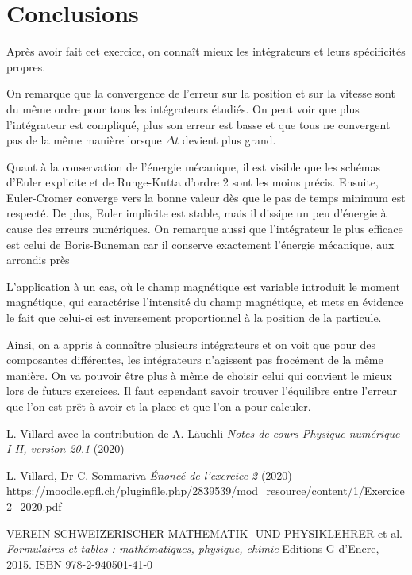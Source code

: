 \documentclass[a4paper,12pt,twoside]{article}
\begin{document}
\section{Conclusions}

Apr\`es avoir fait cet exercice, on conna\^it mieux les int\'egrateurs et leurs sp\'ecificit\'es propres. 

On remarque que la convergence de l'erreur sur la position et sur la vitesse sont du m\^eme ordre pour tous les int\'egrateurs \'etudi\'es. 
On peut voir que plus l'int\'egrateur est compliqu\'e, plus son erreur est basse et que tous ne convergent pas de la m\^eme mani\`ere lorsque $\Delta t$ devient plus grand. 

Quant \`a la conservation de l'\'energie m\'ecanique, il est visible que les sch\'emas d'Euler explicite et de Runge-Kutta d'ordre 2 sont les moins pr\'ecis.  Ensuite, Euler-Cromer converge vers la bonne valeur d\`es que le pas de temps minimum est respect\'e. De plus, Euler implicite est stable, mais il dissipe un peu d'\'energie \`a cause des erreurs num\'eriques. 
On remarque aussi que l'int\'egrateur le plus efficace est celui de Boris-Buneman car il conserve exactement l'\'energie m\'ecanique, aux arrondis pr\`es

L'application \`a un cas, o\`u le champ magn\'etique est variable introduit le moment magn\'etique, qui caract\'erise l'intensit\'e du champ magn\'etique, et mets en \'evidence le fait que celui-ci est inversement proportionnel \`a la position de la particule.


Ainsi, on a appris \`a conna\^itre plusieurs int\'egrateurs et on voit que pour des composantes diff\'erentes, les int\'egrateurs n'agissent pas froc\'ement de la m\^eme mani\`ere. On va pouvoir \^etre plus \`a m\^eme de choisir celui qui convient le mieux lors de futurs exercices. Il faut cependant savoir trouver l'\'equilibre entre l'erreur que l'on est pr\^et \`a avoir et la place et que l'on a pour calculer.




\begin{thebibliography}{99}
 L. Villard avec la contribution de A. L\"auchli {\it Notes de cours Physique numérique I-II, version 20.1} (2020)
 
 L. Villard, Dr C. Sommariva {\it \'Enonc\'e de l'exercice 2} (2020)
 \url{https://moodle.epfl.ch/pluginfile.php/2839539/mod_resource/content/1/Exercice2_2020.pdf}
 
 VEREIN SCHWEIZERISCHER MATHEMATIK- UND PHYSIKLEHRER  et al. {\it Formulaires et tables : mathématiques, physique, chimie} Editions G d'Encre, 2015. ISBN 978-2-940501-41-0
 
\end{thebibliography}
\end{document}
